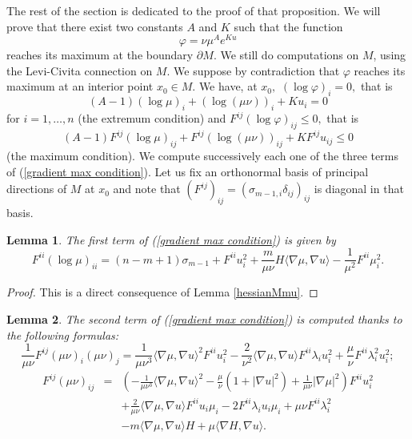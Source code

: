 \documentclass[10pt,reqno,oneside]{amsart}
\newtheorem{lem}{Lemma}[section]
\theoremstyle{definition}
\theoremstyle{remark}
\begin{document}
The rest of the section is dedicated to the proof of that proposition. We will prove that there exist two constants $A$ and $K$ such that the function
$$\varphi=\nu\mu^A e^{Ku}$$
reaches its maximum at the boundary $\partial M.$ We still do computations on $M$, using the Levi-Civita connection on $M.$ We suppose by contradiction that $\varphi$ reaches its maximum at an interior point $x_0\in M.$ We have, at $x_0,$ $(\log\varphi)_i=0,$ that is
\begin{equation}\label{gradient extr condition}
(A-1)(\log\mu)_i+(\log(\mu\nu))_i+Ku_i=0
\end{equation}
for $i=1,\ldots,n$ (the extremum condition) and $F^{ij}(\log\varphi)_{ij}\leq 0,$ that is
\begin{equation}\label{gradient max condition}
(A-1)F^{ij}(\log\mu)_{ij}+F^{ij}(\log(\mu\nu))_{ij}+KF^{ij}u_{ij}\leq 0
\end{equation}
(the maximum condition). We compute successively each one of the three terms of (\ref{gradient max condition}). Let us fix an orthonormal basis of principal directions of $M$ at $x_0$ and note that $(F^{ij})_{ij}=(\sigma_{m-1,i}\delta_{ij})_{ij}$ is diagonal in that basis.
\begin{lem}
The first term of (\ref{gradient max condition}) is given by
\begin{equation}\label{gmct1}
F^{ii}(\log \mu)_{ii}=(n-m+1)\sigma_{m-1}+F^{ii}u_i^2+\frac{m}{\mu\nu}H\langle\nabla\mu,\nabla u\rangle-\frac{1}{\mu^2}F^{ii}\mu_i^2.
\end{equation}
\end{lem}
\begin{proof}
This is a direct consequence of Lemma \ref{hessianMmu}.
\end{proof}
\begin{lem}
The second term of (\ref{gradient max condition}) is computed thanks to the following formulas:
\begin{equation}\label{gmct2}\frac{1}{\mu\nu}F^{ij}(\mu\nu)_i(\mu\nu)_j=\frac{1}{\mu\nu^3}\langle\nabla\mu,\nabla u\rangle^2F^{ii}u_i^2-\frac{2}{\nu^2}\langle\nabla\mu,\nabla u\rangle F^{ii}\lambda_iu_i^2+\frac{\mu}{\nu}F^{ii}\lambda_i^2u_i^2;
\end{equation}
\begin{eqnarray}
F^{ij}(\mu\nu)_{ij}&=&\left(-\frac{1}{\mu\nu^3}\langle\nabla\mu,\nabla u\rangle^2-\frac{\mu}{\nu}(1+|\nabla u|^2)+\frac{1}{\mu\nu}|\nabla \mu|^2\right)F^{ii}u_i^2\label{gmct3}\\
&&+\frac{2}{\mu\nu}\langle\nabla\mu,\nabla u\rangle F^{ii}u_i\mu_i-2F^{ii}\lambda_iu_i\mu_i+\mu\nu F^{ii}\lambda_i^2\nonumber\\
&&-m\langle\nabla\mu,\nabla u\rangle H+\mu\langle\nabla H,\nabla u\rangle.\nonumber
\end{eqnarray}
\end{lem}
\end{document}
